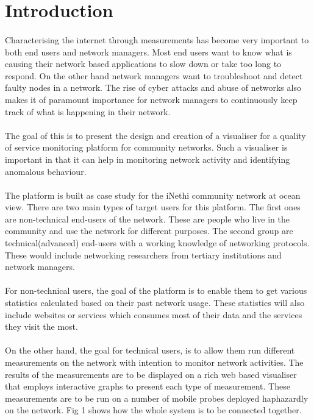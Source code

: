 \section{Introduction}
	\paragraph{}
Characterising the internet through measurements has become very important to both end users and network
managers. Most end users want to know what is causing their network based applications to slow down or take too long to respond. On the other hand network managers want to troubleshoot and detect faulty nodes in a network. The rise of cyber attacks and abuse of networks also makes it of paramount importance for network managers to continuously keep track of what is happening in their network.
\paragraph{}
The goal of this is to present the design and creation of a visualiser for a quality of service monitoring platform for community networks. Such a visualiser is important in that it can help in monitoring network activity and identifying anomalous behaviour.
\paragraph{}
The platform is built as case study for the iNethi community network at ocean view. There are two main types of target users for this platform. The first ones are non-technical end-users of the network. These are people who live in the community and use the network for different purposes. The second group are technical(advanced) end-users with a working knowledge of networking protocols. These would include networking researchers from tertiary institutions and network managers.
\paragraph{}
For non-technical users, the goal of the platform is to enable them to get various statistics calculated based on their past network usage. These statistics will also include websites or services which consumes most of their data and the services they visit the most.
\paragraph{}
On the other hand, the goal for technical users, is to allow them run different measurements on the network with intention to monitor network activities. The results of the measurements are to be displayed on a rich web based visualiser that employs interactive graphs to present each type of measurement. These measurements are to be run on a number of mobile probes deployed haphazardly on the network. Fig 1 shows how the whole system is to be connected together.


